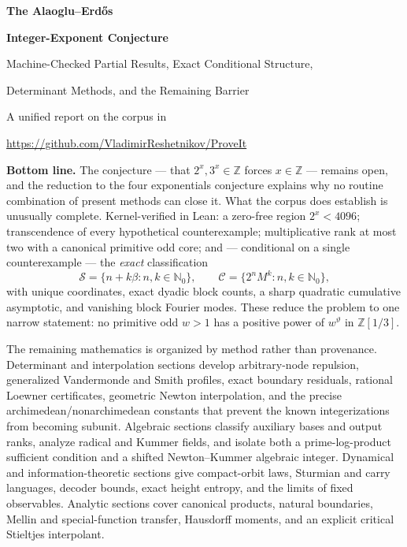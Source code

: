 \documentclass[11pt,oneside]{article}
\theoremstyle{definition}
\theoremstyle{remark}
\newcommand{\Nzero}{\mathbb N_0}
\newcommand{\Z}{\mathbb Z}
\newcommand{\thetaq}{\vartheta}
\newcommand{\Sol}{\mathcal S}
\newcommand{\Cand}{\mathcal C}
\newcommand{\Zthree}{\Z[1/3]}
\begin{document}

\begin{titlepage}
\centering
\vspace*{0.75cm}
{\Huge\bfseries The Alaoglu--Erd\H{o}s\par}
\vspace{0.2cm}
{\Huge\bfseries Integer-Exponent Conjecture\par}
\vspace{0.65cm}
{\LARGE Machine-Checked Partial Results, Exact Conditional Structure,\par}
\vspace{0.12cm}
{\LARGE Determinant Methods, and the Remaining Barrier\par}
\vspace{1.0cm}
{\large A unified report on the corpus in\par}
\vspace{0.12cm}
{\large \url{https://github.com/VladimirReshetnikov/ProveIt}\par}
\vfill
\begin{minipage}{0.9\textwidth}
\small
\textbf{Bottom line.}
The conjecture --- that $2^x,3^x\in\Z$ forces $x\in\Z$ --- remains open, and the reduction to
the four exponentials conjecture explains why no routine combination of present methods can
close it.  What the corpus does establish is unusually complete.  Kernel-verified in Lean: a
zero-free region $2^x<4096$; transcendence of every hypothetical counterexample; multiplicative
rank at most two with a canonical primitive odd core; and --- conditional on a single
counterexample --- the \emph{exact} classification
\[
  \Sol=\{n+k\beta:n,k\in\Nzero\},
  \qquad
  \Cand=\{2^nM^k:n,k\in\Nzero\},
\]
with unique coordinates, exact dyadic block counts, a sharp quadratic cumulative asymptotic,
and vanishing block Fourier modes.  These reduce the problem to one narrow statement: no
primitive odd $w>1$ has a positive power of $w^{\thetaq}$ in $\Zthree$.

The remaining mathematics is organized by method rather than provenance.  Determinant and
interpolation sections develop arbitrary-node repulsion, generalized Vandermonde and Smith
profiles, exact boundary residuals, rational Loewner certificates, geometric Newton
interpolation, and the precise archimedean/nonarchimedean constants that prevent the known
integerizations from becoming subunit.  Algebraic sections classify auxiliary bases and
output ranks, analyze radical and Kummer fields, and isolate both a prime-log-product
sufficient condition and a shifted Newton--Kummer algebraic integer.  Dynamical and
information-theoretic sections give compact-orbit laws, Sturmian and carry languages,
decoder bounds, exact height entropy, and the limits of fixed observables.  Analytic sections
cover canonical products, natural boundaries, Mellin and special-function transfer,
Hausdorff moments, and an explicit critical Stieltjes interpolant.


\end{minipage}
\end{titlepage}
\end{document}
